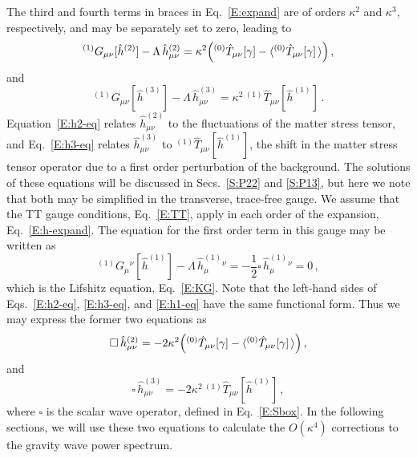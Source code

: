 \documentclass[preprint,prd,showpacs,superscriptaddress]{revtex4}
\begin{document}
The third and fourth terms in braces in Eq.~\eqref{E:expand} are of orders $\kappa^2$ and $\kappa^3$, 
respectively, and may be separately set to zero, leading to 
\begin{equation}
{}^{(1)}G_{\mu\nu}[\hat{h}^{(2)}]-\Lambda\,\hat{h}^{(2)}_{\mu\nu}= \kappa^{2}\Bigl({}^{(0)}\hat{T}_{\mu\nu}[\gamma]-\langle{}^{(0)}\hat{T}_{\mu\nu}[\gamma]\,\rangle\Bigr)\,,
\label{E:h2-eq}
\end{equation}
and
\begin{equation}
{}^{(1)}G_{\mu\nu}[\hat{h}^{(3)}]-\Lambda\,\hat{h}^{(3)}_{\mu\nu}=\kappa^{2}\,{}^{(1)}\hat{T}_{\mu\nu}[\hat{h}^{(1)}]\,.
\label{E:h3-eq}
\end{equation}
Equation~\eqref{E:h2-eq} relates $\hat{h}^{(2)}_{\mu\nu}$ to the fluctuations of the matter stress tensor, and
Eq.~\eqref{E:h3-eq} relates $\hat{h}^{(3)}_{\mu\nu}$ to ${}^{(1)}\hat{T}_{\mu\nu}[\hat{h}^{(1)}]$, the shift in the matter
stress tensor operator due to a first order perturbation of the background. The solutions of these equations will
be discussed in Secs.~\ref{S:P22}   and  \ref{S:P13}, but here we note that both may be simplified in the transverse, trace-free gauge.
We assume that the TT gauge conditions, Eq.~\eqref{E:TT}, apply in each order of the expansion, 
Eq.~\eqref{E:h-expand}. The equation for the first order term in this gauge may be written as
\begin{equation}
{}^{(1)}G_{\mu}{}^{\nu}[\hat{h}^{(1)}]-\Lambda\,\hat{h}^{(1)}_{\mu}{}^{\nu} =
-\frac{1}{2} \square\, \hat{h}^{(1)}_{\mu}{}^{\nu}=0\,,
\label{E:h1-eq}
\end{equation}
which is the Lifshitz equation, Eq.~\eqref{E:KG}. Note that the  left-hand sides of Eqs.~\eqref{E:h2-eq}, \eqref{E:h3-eq}, and
 \eqref{E:h1-eq} have the same functional form. Thus we may express the
former two equations as
\begin{equation}
\square\,\hat{h }^{(2)}_{\mu\nu} = 
-2 \kappa^{2}\Bigl({}^{(0)}\hat{T}_{\mu\nu}[\gamma]-\langle{}^{(0)}\hat{T}_{\mu\nu}[\gamma]\,\rangle\Bigr)\,,
\label{E:h2-eq2}
\end{equation}
and
\begin{equation}
\square\, \hat{h}^{(3)}_{\mu\nu} = -2\kappa^{2}\,{}^{(1)}\hat{T}_{\mu\nu}[\hat{h}^{(1)}]\,,
\label{E:h3-eq2}
\end{equation}
where $\square$ is the scalar wave operator, defined in Eq.~\eqref{E:Sbox}.
In the following sections, we will use these two equations to calculate the $O(\kappa^4)$ corrections
to the gravity wave power spectrum.
\end{document}
